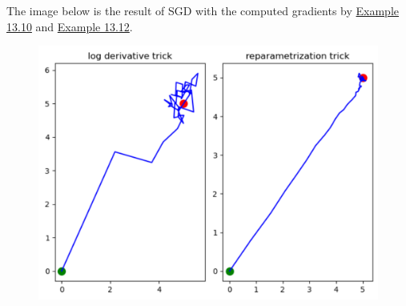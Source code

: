 \documentclass{report}
\begin{document}
\begin{example}
    The image below is the result of SGD with the computed gradients by \hyperref[example:13.10]{Example 13.10} and \hyperref[example:13.12]{Example 13.12}.

    \begin{figure}[H]
        \centering
        \includegraphics[width=1.0\textwidth]{13.2.png}
    \end{figure}
\end{example}
\end{document}
